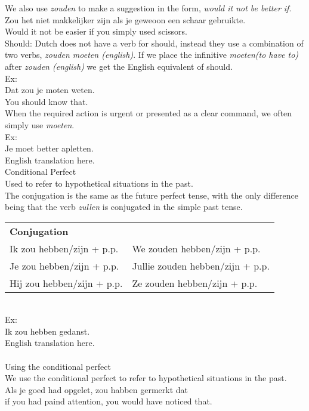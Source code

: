 \documentclass[letterpaper,11pt]{article}
\begin{document}
We also use \textit{zouden} to make a suggestion in the form, \textit{would it
not be better if}. \\
Zou het niet makkelijker zijn als je geweoon een schaar gebruikte. \\
Would it not be easier if you simply used scissors. \\
Should: Dutch does not have a verb for should, instead they use a combination of
two verbs, \textit{zouden moeten (english)}. If we place the infinitive
\textit{moeten(to have to)} after \textit{zouden (english)} we get the English
equivalent of should. \\
Ex: \\
Dat zou je moten weten. \\
You should know that. \\
When the required action is urgent or presented as a clear command, we often
simply use \textit{moeten}. \\ 
Ex: \\
Je moet better apletten. \\
English translation here. \\
Conditional Perfect \\
Used to refer to hypothetical situations in the past. \\
The conjugation is the same as the future perfect tense, with the only
difference being that the verb \textit{zullen} is conjugated in the simple past
tense. \\
\begin{tabular}[t]{l l}
    \textbf{Conjugation} \\
    Ik zou hebben/zijn + p.p. & We zouden hebben/zijn + p.p. \\
    Je zou hebben/zijn + p.p. & Jullie zouden hebben/zijn + p.p. \\
    Hij zou hebben/zijn + p.p. & Ze zouden hebben/zijn + p.p. \\
\end{tabular} 
\\
Ex: \\
Ik zou hebben gedanst. \\
English translation here. \\
\\
Using the conditional perfect \\
We use the conditional perfect to refer to hypothetical situations in the past.  \\
Als je goed had opgelet, zou habben germerkt dat \\
if you had paind attention, you would have noticed that. \\
\end{document}
